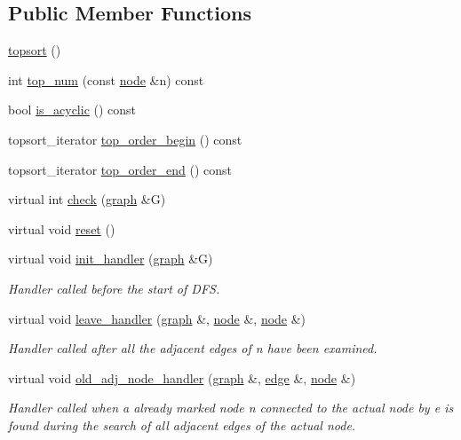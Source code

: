 \subsection*{Public Member Functions}
\begin{DoxyCompactItemize}
\item 
\mbox{\hyperlink{classtopsort_a76a9055969b9dbf006320040be9fd5e6}{topsort}} ()
\item 
int \mbox{\hyperlink{classtopsort_a0f0b52c54ffa4d1056ef96f16489f30f}{top\+\_\+num}} (const \mbox{\hyperlink{classnode}{node}} \&n) const
\item 
bool \mbox{\hyperlink{classtopsort_a05a4cb00bbd60859f4939355b23c25f1}{is\+\_\+acyclic}} () const
\item 
topsort\+\_\+iterator \mbox{\hyperlink{classtopsort_ab220dcce845e001b0f737d0dc7751abc}{top\+\_\+order\+\_\+begin}} () const
\item 
topsort\+\_\+iterator \mbox{\hyperlink{classtopsort_ac9b784654ae0c4e9736931d63d03291b}{top\+\_\+order\+\_\+end}} () const
\item 
virtual int \mbox{\hyperlink{classtopsort_a777a9a68c4081d22e7b698ed3c515343}{check}} (\mbox{\hyperlink{classgraph}{graph}} \&G)
\item 
virtual void \mbox{\hyperlink{classtopsort_af93d2f617ceae83ee2a4f9106fbc32c3}{reset}} ()
\item 
virtual void \mbox{\hyperlink{classtopsort_a21aaf28fc280094ed43288e58d8e3ae1}{init\+\_\+handler}} (\mbox{\hyperlink{classgraph}{graph}} \&G)
\begin{DoxyCompactList}\small\item\em Handler called before the start of D\+FS. \end{DoxyCompactList}\item 
virtual void \mbox{\hyperlink{classtopsort_afd27bb676fd3987456bf71d83c05acb8}{leave\+\_\+handler}} (\mbox{\hyperlink{classgraph}{graph}} \&, \mbox{\hyperlink{classnode}{node}} \&, \mbox{\hyperlink{classnode}{node}} \&)
\begin{DoxyCompactList}\small\item\em Handler called after all the adjacent edges of {\itshape n} have been examined. \end{DoxyCompactList}\item 
virtual void \mbox{\hyperlink{classtopsort_ab42587b5a1e776be5106502dfeb6b0b1}{old\+\_\+adj\+\_\+node\+\_\+handler}} (\mbox{\hyperlink{classgraph}{graph}} \&, \mbox{\hyperlink{classedge}{edge}} \&, \mbox{\hyperlink{classnode}{node}} \&)
\begin{DoxyCompactList}\small\item\em Handler called when a already marked node {\itshape n} connected to the actual node by {\itshape e} is found during the search of all adjacent edges of the actual node. \end{DoxyCompactList}\end{DoxyCompactItemize}
